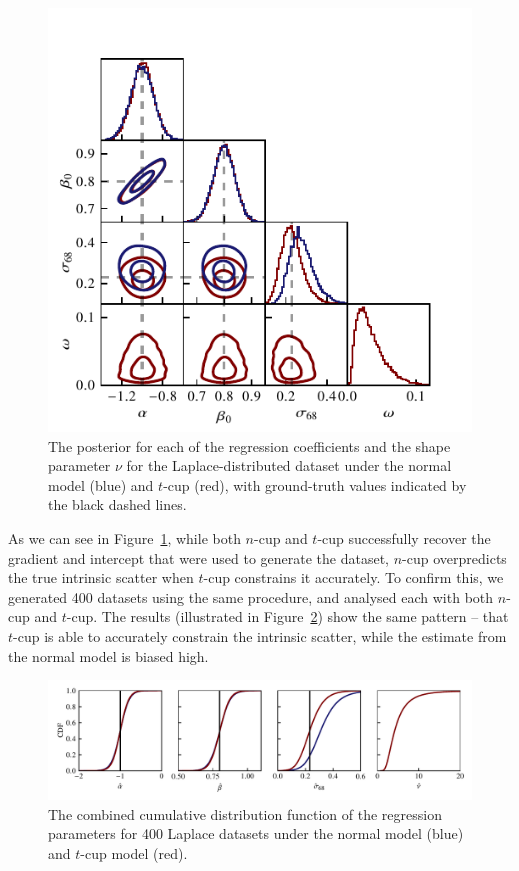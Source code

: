 \documentclass[fleqn,usenatbib]{rasti}
\begin{document}
\begin{figure}
    \includegraphics[width=\columnwidth]{graphics/fixed/corner_laplace.pdf}
    \caption{The posterior for each of the regression coefficients and the shape
    parameter $\nu$ for the Laplace-distributed dataset under the normal model
    (blue) and $t$-cup (red), with ground-truth values indicated by the black
    dashed lines.}
    \label{fig:results.laplace.corner}
\end{figure}

As we can see in Figure~\ref{fig:results.laplace.corner}, while both $n$-cup and
$t$-cup successfully recover the gradient and intercept that were used to
generate the dataset, $n$-cup overpredicts the true intrinsic scatter when
$t$-cup constrains it accurately. To confirm this, we generated 400 datasets
using the same procedure, and analysed each with both $n$-cup and $t$-cup. The
results (illustrated in Figure~\ref{fig:results.laplace.map}) show the same
pattern -- that $t$-cup is able to accurately constrain the intrinsic scatter,
while the estimate from the normal model is biased high.

\begin{figure}
    \includegraphics[width=\textwidth, trim={0 0.3cm 0 0}, clip]{
        graphics/fixed/laplace_cdf.pdf
    }
    \caption{The combined cumulative distribution function of the regression
    parameters for 400 Laplace datasets under the normal model
    (blue) and $t$-cup model (red).}
    \label{fig:results.laplace.map}
\end{figure}
\end{document}
